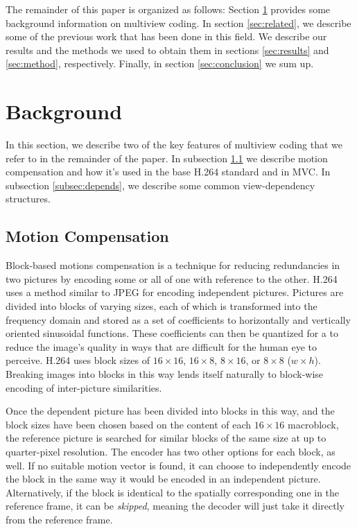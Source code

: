 \documentclass[twoside, 11pt]{article}
\begin{document}
The remainder of this paper is organized as follows: Section
\ref{sec:background} provides some background information on multiview coding.
In section \ref{sec:related}, we describe some of the previous work that has
been done in this field. We describe our results and the methods we used to
obtain them in sections \ref{sec:results} and \ref{sec:method}, respectively.
Finally, in section \ref{sec:conclusion} we sum up.

\section{Background} %
\label{sec:background} %

In this section, we describe two of the key features of multiview coding that
we refer to in the remainder of the paper. In subsection \ref{subsec:motion} we
describe motion compensation and how it's used in the base H.264 standard and in
MVC. In subsection \ref{subsec:depends}, we describe some common view-dependency
structures.

\subsection{Motion Compensation}
\label{subsec:motion}

Block-based motions compensation is a technique for reducing redundancies in two
pictures by encoding some or all of one with reference to the other. H.264 uses
a method similar to JPEG for encoding independent pictures. Pictures are divided
into blocks of varying sizes, each of which is transformed into the frequency
domain and stored as a set of coefficients to horizontally and vertically
oriented sinusoidal functions. These coefficients can then be quantized for a
to reduce the image's quality in ways that are difficult for the human eye to
perceive. H.264 uses block sizes of $16\times 16$, $16\times 8$, $8\times 16$,
or $8\times 8$ ($w\times h$). Breaking images into blocks in this way lends
itself naturally to block-wise encoding of inter-picture similarities.

Once the dependent picture has been divided into blocks in this way, and the
block sizes have been chosen based on the content of each $16\times 16$
macroblock, the reference picture is searched for similar blocks of the same
size at up to quarter-pixel resolution. The encoder has two other options for
each block, as well. If no suitable motion vector is found, it can choose to
independently encode the block in the same way it would be encoded in an
independent picture. Alternatively, if the block is identical to the spatially
corresponding one in the reference frame, it can be {\it skipped}, meaning the
decoder will just take it directly from the reference frame.
\end{document}
